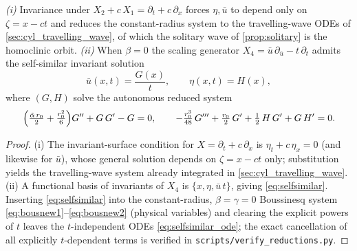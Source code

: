 \documentclass[alpha-refs, 12pt]{wiley-article}
\begin{document}
\begin{lemma}\label{lem:reductions}
\emph{(i)} Invariance under $X_{2}+c\,X_{1}=\partial_{t}+c\,\partial_{x}$ forces $\eta,\bar{u}$ to depend only on $\zeta=x-ct$ and reduces the constant-radius system to the travelling-wave ODEs of \cref{sec:cyl_travelling_wave}, of which the solitary wave of \cref{prop:solitary} is the homoclinic orbit. \emph{(ii)} When $\beta=0$ the scaling generator $X_{4}=\bar{u}\,\partial_{\bar{u}}-t\,\partial_{t}$ admits the self-similar invariant solution
\begin{equation}\label{eq:selfsimilar}
  \bar{u}(x,t)=\frac{G(x)}{t},\qquad \eta(x,t)=H(x),
\end{equation}
where $(G,H)$ solve the autonomous reduced system
\begin{equation}\label{eq:selfsimilar_ode}
  \Bigl(\tfrac{\tilde{\alpha}\,r_{0}}{2}+\tfrac{r_{0}^{2}}{6}\Bigr)G''+G\,G'-G=0,\qquad
  -\tfrac{r_{0}^{3}}{48}\,G'''+\tfrac{r_{0}}{2}\,G'+\tfrac12\,H\,G'+G\,H'=0.
\end{equation}
\end{lemma}
\begin{proof}
(i) The invariant-surface condition for $X=\partial_{t}+c\,\partial_{x}$ is $\eta_{t}+c\,\eta_{x}=0$ (and likewise for $\bar{u}$), whose general solution depends on $\zeta=x-ct$ only; substitution yields the travelling-wave system already integrated in \cref{sec:cyl_travelling_wave}. (ii) A functional basis of invariants of $X_{4}$ is $\{x,\eta,\bar{u}\,t\}$, giving \eqref{eq:selfsimilar}. Inserting \eqref{eq:selfsimilar} into the constant-radius, $\beta=\gamma=0$ Boussinesq system \eqref{eq:bousnew1}--\eqref{eq:bousnew2} (physical variables) and clearing the explicit powers of $t$ leaves the $t$-independent ODEs \eqref{eq:selfsimilar_ode}; the exact cancellation of all explicitly $t$-dependent terms is verified in \texttt{scripts/verify\_reductions.py}.
\end{proof}
\end{document}
